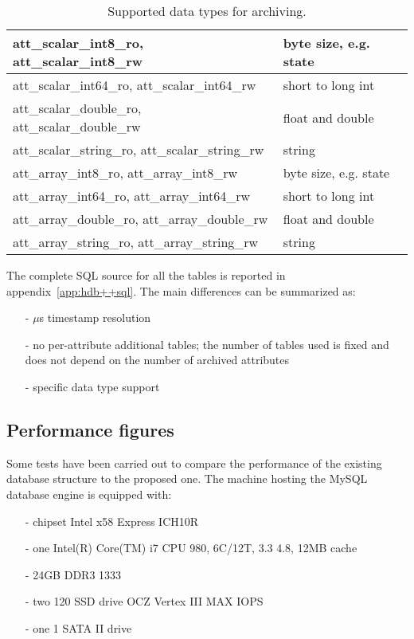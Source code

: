 \documentclass[11pt,a4paper]{article}
\newcommand{\unit}[1]{\thinspace{#1}}
\begin{document}
\begin{table}[H]
	\centering
	\begin{tabular}{l|l}
		\hline
		att\_scalar\_int8\_ro, att\_scalar\_int8\_rw & byte size, e.g. state \\
		\hline
		att\_scalar\_int64\_ro, att\_scalar\_int64\_rw & short to long int \\
		\hline
		att\_scalar\_double\_ro, att\_scalar\_double\_rw & float and double \\
		\hline
		att\_scalar\_string\_ro, att\_scalar\_string\_rw & string \\
		\hline
		att\_array\_int8\_ro, att\_array\_int8\_rw & byte size, e.g. state \\
		\hline
		att\_array\_int64\_ro, att\_array\_int64\_rw & short to long int \\
		\hline
		att\_array\_double\_ro, att\_array\_double\_rw & float and double \\
		\hline
		att\_array\_string\_ro, att\_array\_string\_rw & string \\
		\hline
	\end{tabular}
	\caption{Supported data types for archiving.}
	\label{db:datatypes}
\end{table}
The complete SQL source for all the tables is reported in
appendix~\ref{app:hdb++sql}. The main differences can be summarized as:
\begin{itemize}
	\item[-] $\mu$s timestamp resolution
	\item[-] no per-attribute additional tables; the number of tables used
					 is fixed and does not depend on the number of archived attributes
	\item[-] specific data type support
\end{itemize}
	
\subsection{Performance figures}
Some tests have been carried out to compare the performance of
the existing database structure to the proposed one.
The machine hosting the MySQL database engine is equipped with:
\begin{itemize}
	\item[-] chipset Intel x58 Express ICH10R
	\item[-] one Intel(R) Core(TM) i7 CPU 980, 6C/12T, 3.3\unit{GHz}
				4.8\unit{GT/s}, 12MB cache
	\item[-] 24GB DDR3 1333\unit{MHz}
	\item[-] two 120\unit{GB} SSD drive OCZ Vertex III MAX IOPS
	\item[-] one 1\unit{TB} SATA II drive
\end{itemize}
\end{document}
